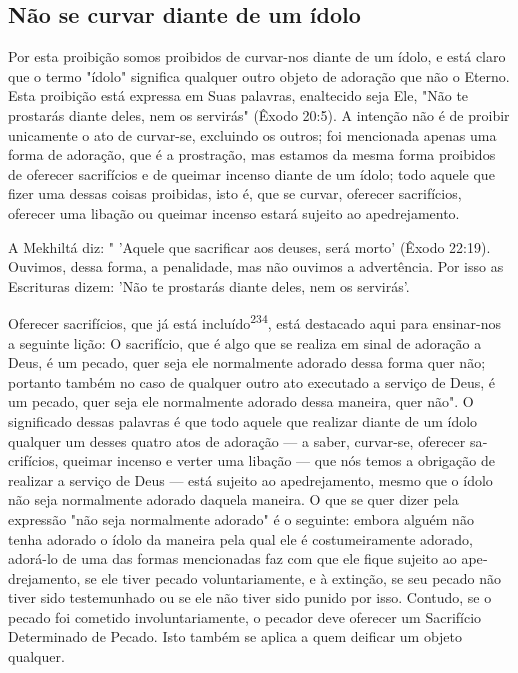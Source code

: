 \begin{itemize}
\begin{enumrate}
\begin{itemize}
\begin{itemize}
\begin{itemize}
\section{Não se curvar diante de um ídolo}

Por esta proibição somos proibidos de curvar-nos diante de um ído­lo, e
está claro que o termo "ídolo" significa qualquer outro objeto de
adora­ção que não o Eterno. Esta proibição está expressa em Suas
palavras, enalteci­do seja Ele, "Não te prostarás diante deles, nem os
servirás" (Êxodo 20:5). A intenção não é de proibir unicamente o ato de
curvar-se, excluindo os outros; foi mencionada apenas uma forma de
adoração, que é a prostração, mas esta­mos da mesma forma proibidos de
oferecer sacrifícios e de queimar incenso diante de um ídolo; todo
aquele que fizer uma dessas coisas proibidas, isto é, que se curvar,
oferecer sacrifícios, oferecer uma libação ou queimar incenso estará
sujeito ao apedrejamento.

A Mekhiltá diz: " 'Aquele que sacrificar aos deuses, será morto' (Êxo­do
22:19). Ouvimos, dessa forma, a penalidade, mas não ouvimos a
advertên­cia. Por isso as Escrituras dizem: 'Não te prostarás diante
deles, nem os servirás'.



Oferecer sacrifícios, que já está incluído\textsuperscript{234}, está
destacado aqui para ensinar-nos a seguinte lição: O sacrifício, que é
algo que se realiza em sinal de adoração a Deus, é um pecado, quer seja
ele normalmente adorado dessa forma quer não; portanto também no caso de
qualquer outro ato executado a serviço de Deus, é um pecado, quer seja
ele normalmente adorado dessa maneira, quer não". O significado dessas
palavras é que todo aquele que realizar diante de um ídolo qualquer um
desses quatro atos de adoração --- a saber, curvar-se, oferecer
sa­crifícios, queimar incenso e verter uma libação --- que nós temos a
obrigação de realizar a serviço de Deus --- está sujeito ao
apedrejamento, mesmo que o ídolo não seja normalmente adorado daquela
maneira. O que se quer dizer pela expressão "não seja normalmente
adorado" é o seguinte: embora alguém não tenha adorado o ídolo da
maneira pela qual ele é costumeiramente adorado, adorá-lo de uma das
formas mencionadas faz com que ele fique sujeito ao ape­drejamento, se
ele tiver pecado voluntariamente, e à extinção, se seu pecado não tiver
sido testemunhado ou se ele não tiver sido punido por isso. Contudo, se
o pecado foi cometido involuntariamente, o pecador deve oferecer um
Sa­crifício Determinado de Pecado. Isto também se aplica a quem deificar
um ob­jeto qualquer.


\end{itemize}
\end{itemize}
\end{itemize}
\end{enumrate}
\end{itemize}

